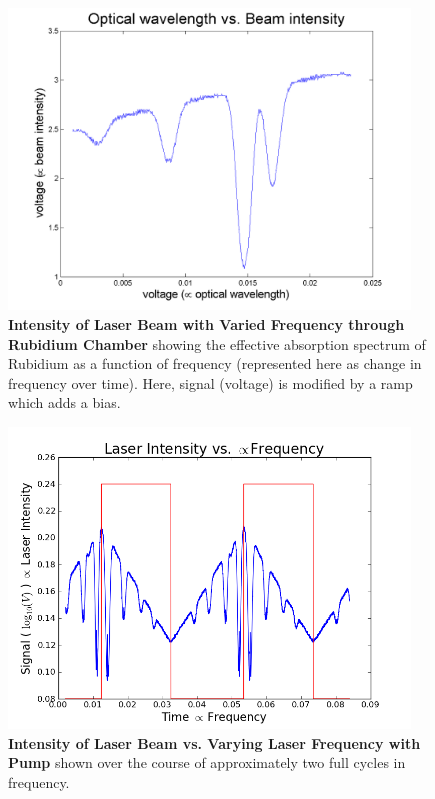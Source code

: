\documentclass[paper=a4, fontsize=11pt]{scrartcl} %
\numberwithin{equation}{section}
\numberwithin{figure}{section}
\numberwithin{table}{section}
\begin{document}
\begin{figure}[H] \begin{center}
  \includegraphics[height=80mm]{absorb3.png}
  \caption{\textbf{Intensity of Laser Beam with Varied Frequency through Rubidium Chamber} showing the effective absorption spectrum of Rubidium as a function of frequency (represented here as change in frequency over time). Here, signal (voltage) is modified by a ramp which adds a bias.}
  \label{fig:absorb1}
\end{center} \end{figure}

\begin{figure}[H] \begin{center}
  \includegraphics[height=80mm]{2-2-002.png}
  \caption{\textbf{Intensity of Laser Beam vs. Varying Laser Frequency with Pump}  shown over the course of approximately two full cycles in frequency.}
  \label{fig:absorb2}
\end{center} \end{figure}
\end{document}
